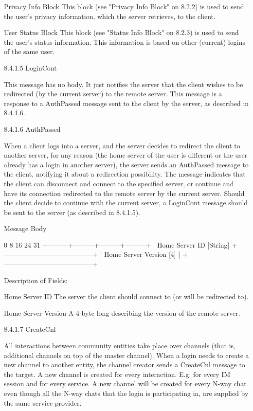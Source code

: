 \documentclass[titlepage,oneside]{book}
\begin{document}
Privacy Info Block
  This block (see "Privacy Info Block" on 8.2.2) is used to
  send the user's privacy information, which the server retrieves, to
  the client.

User Status Block
  This block (see "Status Info Block" on 8.2.3) is used to
  send the user's status information. This information is based on
  other (current) logins of the same user.

8.4.1.5 LoginCont

This message has no body. It just notifies the server that the client
wishes to be redirected (by the current server) to the remote server.
This message is a response to a AuthPassed message sent to the client
by the server, as described in 8.4.1.6.

8.4.1.6 AuthPassed

When a client logs into a server, and the server decides to redirect
the client to another server, for any reason (the home server of the
user is different or the user already has a login in another server),
the server sends an AuthPassed message to the client, notifying it
about a redirection possibility. The message indicates that the client
can disconnect and connect to the specified server, or continue and
have its connection redirected to the remote server by the current
server. Should the client decide to continue with the current server, a
LoginCont message should be sent to the server (as described in
8.4.1.5).

Message Body

0         8         16        24      31
+---------+---------+---------+---------+
| Home Server ID [String]
+---------------------------------------+
|        Home Server Version [4]        |
+---------------------------------------+

Description of Fields:

Home Server ID
  The server the client should connect to (or will be redirected to).

Home Server Version
  A 4-byte long describing the version of the remote server.

8.4.1.7 CreateCnl

All interactions between community entities take place over channels
(that is, additional channels on top of the master channel). When a
login needs to create a new channel to another entity, the channel
creator sends a CreateCnl message to the target. A new channel is
created for every interaction. E.g. for every IM session and for every
service. A new channel will be created for every N-way chat even though
all the N-way chats that the login is participating in, are supplied by
the same service provider.
\end{document}
